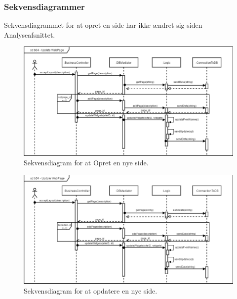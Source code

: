 \subsubsection{Sekvensdiagrammer}

Sekvensdiagrammet for at opret en side har ikke ændret sig siden Analyseafsnittet.

\begin{figure}[H]
\includegraphics[width=\linewidth]{elaborationsdokumentet/figurer/analyse/sekvensdiagram_for_CMS.png}
      \caption{Sekvensdiagram for at Opret en nye side.}
      \label{Des:Sekvensdiagram-CMS-OpretSide}
  \end{figure}


          \begin{figure}[H]
          \includegraphics[width=\linewidth]{elaborationsdokumentet/figurer/analyse/Update_Webpage.png}
      \caption{Sekvensdiagram for at opdatere en nye side.}
      \label{Des:Sekvensdiagram-CMS-OpdatereSide}
  \end{figure}




\FloatBarrier



